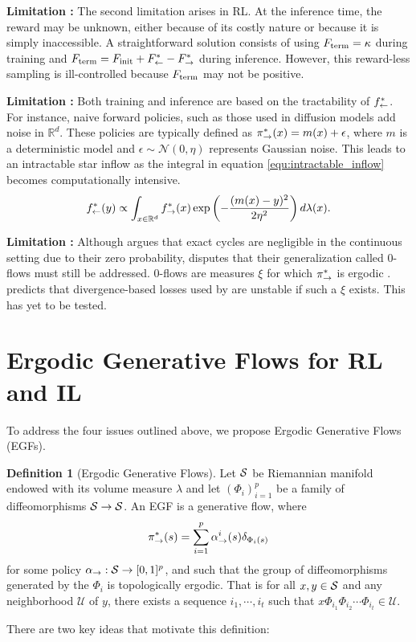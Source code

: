 \documentclass{article}
\theoremstyle{plain}
\theoremstyle{definition}
\newtheorem{definition}[theorem]{Definition}
\theoremstyle{remark}
\theoremstyle{fact}
\begin{document}
    \textbf{Limitation :} The second limitation arises in RL. At the inference time, the reward may be unknown, either because of its costly nature or because it is simply inaccessible. A straightforward solution consists of using $F_{\mathrm{term}} = \kappa$ during training and $F_{\mathrm{term}}= F_{\mathrm{init}} + F^*_{\leftarrow} - F^*_{\rightarrow}$ during inference. However, this reward-less sampling is ill-controlled because $F_{\mathrm{term}}$ may not be positive.

    \textbf{Limitation :} Both training and inference are based on the tractability of $f^*_{\leftarrow}$. For instance, naive forward policies, such as those used in diffusion models add noise in $\mathbb{R}^d$. These policies are typically defined as $\pi_{\rightarrow}^*(x) = m(x) + \epsilon$, where $m$ is a deterministic model and $\epsilon \sim \mathcal{N}(0, \eta)$ represents Gaussian noise. This leads to an intractable star inflow as the integral in equation \eqref{equ:intractable_inflow} becomes computationally intensive.
    \begin{equation}
        \label{equ:intractable_inflow}
         f^*_{\leftarrow}(y)  \propto \int_{x\in \mathbb R^d} f^*_{\rightarrow}(x) \exp\left(-\frac{(m(x)-y)^2}{2\eta^2}\right)d\lambda(x).
    \end{equation}

    \textbf{Limitation :} Although \citet{li2023cflownets} argues that exact cycles are negligible in the continuous setting due to their zero probability, \citet{brunswic2024theory} disputes that their generalization called 0-flows must still be addressed. 0-flows are measures $\xi$ for which $\pi_{\rightarrow}^*$ is ergodic \cite{walters2000introduction}. \citet{brunswic2024theory} predicts that divergence-based losses used by \citet{bengio2023gflownet} are unstable if such a $\xi$ exists. This has yet to be tested.
        
\section{Ergodic Generative Flows for  RL and IL} \label{sec:fundamentals_EGF}
    To address the four issues outlined above, we propose Ergodic Generative Flows (EGFs).
   
    \begin{definition}[Ergodic Generative Flows]\label{def:egf} 
        Let $\mathcal S$ be Riemannian manifold endowed with its volume measure $\lambda$ and let $(\Phi_{i})_{i=1}^p$ be a family of diffeomorphisms $\mathcal S\rightarrow \mathcal S$. An EGF is a generative flow, where  
        \begin{eqnarray} \label{equ:forward_policy}
            \pi_{\rightarrow}^*(s) = \sum_{i=1}^p\alpha_{\rightarrow}^i(s) \delta_{\Phi_i(s)}
        \end{eqnarray}    
        for some policy $\alpha_{\rightarrow}:\mathcal S \rightarrow [0,1]^p$, and such that the group of diffeomorphisms generated by the $\Phi_i$ is topologically ergodic. That is for all $x,y \in \mathcal S$ and any neighborhood $\mathcal U$ of $y$, there exists a sequence $i_1,\cdots, i_t$ such that $x\Phi_{i_1}\Phi_{i_2}\cdots \Phi_{i_t} \in \mathcal U$.
    \end{definition}
    There are two key ideas that motivate this definition:
\end{document}
